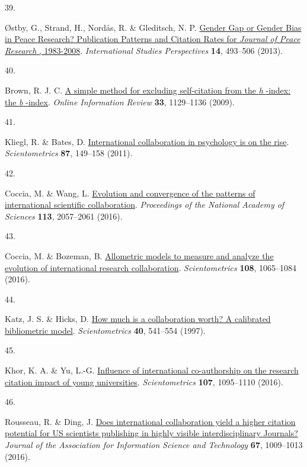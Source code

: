 \documentclass[
  man,floatsintext]{apa6}
\newlength{\cslhangindent}
\newlength{\csllabelwidth}
\newlength{\cslentryspacingunit} %
\newenvironment{CSLReferences}[2] %
 {%
  \setlength{\parindent}{0pt}
  \ifodd #1
  \let\oldpar\par
  \def\par{\hangindent=\cslhangindent\oldpar}
  \fi
  \setlength{\parskip}{#2\cslentryspacingunit}
 }%
 {}
\newcommand{\CSLLeftMargin}[1]{\parbox[t]{\csllabelwidth}{#1}}
\newcommand{\CSLRightInline}[1]{\parbox[t]{\linewidth - \csllabelwidth}{#1}\break}
\begin{document}
\begin{CSLReferences}{0}{0}
\leavevmode{}%
\CSLLeftMargin{39. }%
\CSLRightInline{Østby, G., Strand, H., Nordås, R. \& Gleditsch, N. P. \href{https://doi.org/10.1111/insp.12025}{Gender Gap or Gender Bias in Peace Research? Publication Patterns and Citation Rates for {\emph{Journal of Peace Research}} , 1983-2008}. \emph{International Studies Perspectives} \textbf{14}, 493--506 (2013).}

\leavevmode{}%
\CSLLeftMargin{40. }%
\CSLRightInline{Brown, R. J. C. \href{https://doi.org/10.1108/14684520911011043}{A simple method for excluding self{-}citation from the {\emph{h}} {-}index: the {\emph{b}} {-}index}. \emph{Online Information Review} \textbf{33}, 1129--1136 (2009).}

\leavevmode{}%
\CSLLeftMargin{41. }%
\CSLRightInline{Kliegl, R. \& Bates, D. \href{https://doi.org/10.1007/s11192-010-0299-0}{International collaboration in psychology is on the rise}. \emph{Scientometrics} \textbf{87}, 149--158 (2011).}

\leavevmode{}%
\CSLLeftMargin{42. }%
\CSLRightInline{Coccia, M. \& Wang, L. \href{https://doi.org/10.1073/pnas.1510820113}{Evolution and convergence of the patterns of international scientific collaboration}. \emph{Proceedings of the National Academy of Sciences} \textbf{113}, 2057--2061 (2016).}

\leavevmode{}%
\CSLLeftMargin{43. }%
\CSLRightInline{Coccia, M. \& Bozeman, B. \href{https://doi.org/10.1007/s11192-016-2027-x}{Allometric models to measure and analyze the evolution of international research collaboration}. \emph{Scientometrics} \textbf{108}, 1065--1084 (2016).}

\leavevmode{}%
\CSLLeftMargin{44. }%
\CSLRightInline{Katz, J. S. \& Hicks, D. \href{https://doi.org/10.1007/BF02459299}{How much is a collaboration worth? A calibrated bibliometric model}. \emph{Scientometrics} \textbf{40}, 541--554 (1997).}

\leavevmode{}%
\CSLLeftMargin{45. }%
\CSLRightInline{Khor, K. A. \& Yu, L.-G. \href{https://doi.org/10.1007/s11192-016-1905-6}{Influence of international co-authorship on the research citation impact of young universities}. \emph{Scientometrics} \textbf{107}, 1095--1110 (2016).}

\leavevmode{}%
\CSLLeftMargin{46. }%
\CSLRightInline{Rousseau, R. \& Ding, J. \href{https://doi.org/10.1002/asi.23565}{Does international collaboration yield a higher citation potential for US scientists publishing in highly visible interdisciplinary Journals?} \emph{Journal of the Association for Information Science and Technology} \textbf{67}, 1009--1013 (2016).}


\end{CSLReferences}
\end{document}
